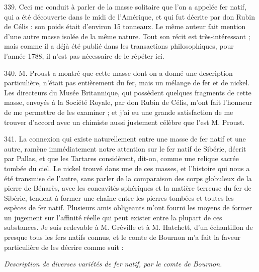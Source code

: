 \documentclass[a4paper, 11pt, oneside, polutonikogreek, french]{article}
\begin{document}
339. Ceci me conduit à parler de la masse solitaire que l'on a appelée fer natif, qui a été découverte dans le midi de l'Amérique, et qui fut décrite par don Rubin de Célis : son poids était d'environ 15 tonneaux. Le même auteur fait mention d'une autre masse isolée de la même nature. Tout son récit est très-intéressant ; mais comme il a déjà été publié dans les transactions philosophiques, pour l'année 1788, il n'est pas nécessaire de le répéter ici.

340. M. Proust a montré que cette masse dont on a donné une description particulière, n'était pas entièrement du fer, mais un mélange de fer et de nickel. Les directeurs du Musée Britannique, qui possèdent quelques fragments de cette masse, envoyés à la Société Royale, par don Rubin de Célis, m'ont fait l'honneur de me permettre de les examiner ; et j'ai eu une grande satisfaction de me trouver d'accord avec un chimiste aussi justement célèbre que l'est M. Proust.

341. La connexion qui existe naturellement entre une masse de fer natif et une autre, ramène immédiatement notre attention sur le fer natif de Sibérie, décrit par Pallas, et que les Tartares considèrent, dit-on, comme une relique sacrée tombée du ciel. Le nickel trouvé dans une de ces masses, et l'histoire qui nous a été transmise de l'autre, sans parler de la comparaison des corps globuleux de la pierre de Bénarès, avec les concavités sphériques et la matière terreuse du fer de Sibérie, tendent à former une chaîne entre les pierres tombées et toutes les espèces de fer natif. Plusieurs amis obligeants m'ont fourni les moyens de former un jugement sur l'affinité réelle qui peut exister entre la plupart de ces substances. Je suis redevable à M. Gréville et à M. Hatchett, d'un échantillon de presque tous les fers natifs connus, et le comte de Bournon m'a fait la faveur particulière de les décrire comme suit :

\emph{Description de diverses variétés de fer natif, par le comte de Bournon.}
\end{document}
